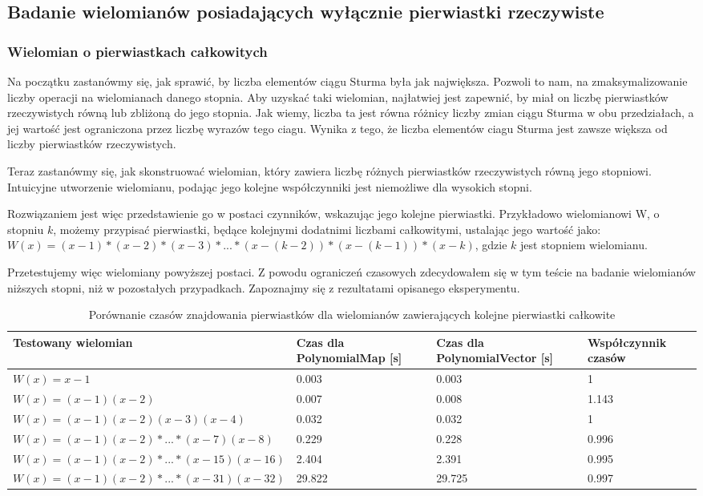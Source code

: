 \subsection{Badanie wielomianów posiadających wyłącznie pierwiastki rzeczywiste}

\subsubsection{Wielomian o pierwiastkach całkowitych}

Na początku zastanówmy się, jak sprawić, by liczba elementów ciągu Sturma była jak największa. Pozwoli to nam, na zmaksymalizowanie liczby operacji na wielomianach danego stopnia. Aby uzyskać taki wielomian, najłatwiej jest zapewnić, by miał on liczbę pierwiastków rzeczywistych równą lub zbliżoną do jego stopnia. Jak wiemy, liczba ta jest równa różnicy liczby zmian ciągu Sturma w obu przedziałach, a jej wartość jest ograniczona przez liczbę wyrazów tego ciagu. Wynika z tego, że liczba elementów ciagu Sturma jest zawsze większa od liczby pierwiastków rzeczywistych.

Teraz zastanówmy się, jak skonstruować wielomian, który zawiera liczbę różnych pierwiastków rzeczywistych równą jego stopniowi. Intuicyjne utworzenie wielomianu, podając jego kolejne współczynniki jest niemożliwe dla wysokich stopni.

Rozwiązaniem jest więc przedstawienie go w postaci czynników, wskazując jego kolejne pierwiastki. Przykładowo wielomianowi W, o stopniu $k$, możemy przypisać pierwiastki, będące kolejnymi dodatnimi liczbami całkowitymi, ustalając jego wartość jako: \\ $W(x)=(x-1)*(x-2)*(x-3)*...*(x-(k-2))*(x-(k-1))*(x-k)$, gdzie $k$ jest stopniem wielomianu.

Przetestujemy więc wielomiany powyższej postaci. Z powodu ograniczeń czasowych zdecydowałem się w tym teście na badanie wielomianów niższych stopni, niż w pozostałych przypadkach. Zapoznajmy się z rezultatami opisanego eksperymentu.

\begin{table}[H]
	\begin{tabular}{ |p{4cm}|p{2.75cm}|p{2.75cm}|p{3.5cm}|} 
		\hline
		Testowany wielomian & Czas dla PolynomialMap [s] & Czas dla PolynomialVector [s] & Współczynnik czasów \\
		\hline
		$W(x) = x-1$ & 0.003 & 0.003 & 1 \\
		$W(x) = (x-1)(x-2)$ & 0.007 & 0.008 & 1.143 \\
		$W(x) = (x-1)(x-2)(x-3)(x-4)$ & 0.032 & 0.032 & 1 \\
		$W(x) = (x-1)(x-2)*...*(x-7)(x-8)$ & 0.229 & 0.228 & 0.996 \\
		$W(x) = (x-1)(x-2)*...*(x-15)(x-16)$ & 2.404 & 2.391 & 0.995 \\
		$W(x) = (x-1)(x-2)*...*(x-31)(x-32)$ & 29.822 & 29.725 & 0.997 \\
		\hline
	\end{tabular}
	\caption{Porównanie czasów znajdowania pierwiastków dla wielomianów zawierających kolejne pierwiastki całkowite}
\end{table}

